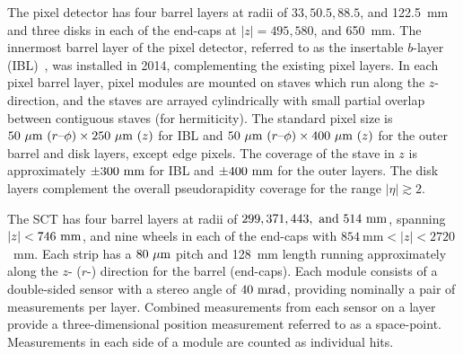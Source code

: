 \documentclass[PUB,UKenglish, texlive=2018]{\ATLASLATEXPATH atlasdoc}
\begin{document}
The pixel detector has four barrel layers at radii of $33, 50.5, 88.5$, and 122.5~mm and three disks in each of the end-caps at $|z|=495, 580$, and 650~mm. 
The innermost barrel layer of the pixel detector, referred to as the insertable $b$-layer (IBL)~\cite{IBL,Abbott:2018ikt}, was installed in 2014, complementing the existing pixel layers. 
In each pixel barrel layer, pixel modules are mounted on staves which run along the $z$-direction, and the staves are arrayed cylindrically with small partial overlap between contiguous staves (for hermiticity).  %
The standard pixel size is $50~{\rm \mu m}~(r\hbox{--}\phi)\times250~{\rm \mu m}~(z)$ for IBL and $50~{\rm \mu m}~(r\hbox{--}\phi)\times400~{\rm \mu m}~(z)$ for the outer barrel and disk layers, except edge pixels. 
The coverage of the stave in $z$ is approximately $\pm300~{\rm mm}$ for IBL and $\pm400~{\rm mm}$ for the outer layers. The disk layers complement the overall pseudorapidity coverage for the range $|\eta|\gtrsim2$. 

The SCT has four barrel layers at radii of $299, 371, 443,~{\rm and}~514~{\rm mm}$, spanning $|z|<746~{\rm mm}$, and nine wheels in each of the end-caps with $854~\mathrm{mm}<|z|<2720$~mm. %
Each strip has a $80~{\rm \mu m}$ pitch and 128~mm length running approximately along the $z$- ($r$-) direction for the barrel (end-caps). 
Each module consists of a double-sided sensor with a stereo angle of $40~{\rm mrad}$, providing nominally a pair of measurements per layer.
Combined measurements from each sensor on a layer provide a three-dimensional position measurement referred to as a space-point. 
Measurements in each side of a module are counted as individual hits.
\end{document}
